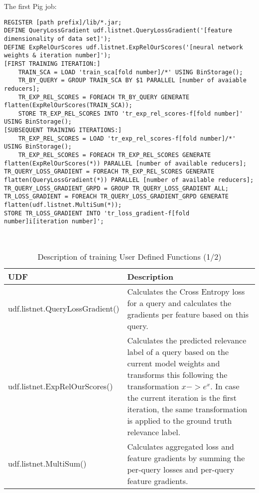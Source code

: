 The first Pig job:\\
\begin{minipage}{\linewidth}
\begin{lstlisting}
REGISTER [path prefix]/lib/*.jar;
DEFINE QueryLossGradient udf.listnet.QueryLossGradient('[feature dimensionality of data set]');
DEFINE ExpRelOurScores udf.listnet.ExpRelOurScores('[neural network weights & iteration number]');
[FIRST TRAINING ITERATION:]
	TRAIN_SCA = LOAD 'train_sca[fold number]/*' USING BinStorage();
	TR_BY_QUERY = GROUP TRAIN_SCA BY $1 PARALLEL [number of avaiable reducers];
	TR_EXP_REL_SCORES = FOREACH TR_BY_QUERY GENERATE flatten(ExpRelOurScores(TRAIN_SCA));
	STORE TR_EXP_REL_SCORES INTO 'tr_exp_rel_scores-f[fold number]' USING BinStorage();
[SUBSEQUENT TRAINING ITERATIONS:]
	TR_EXP_REL_SCORES = LOAD 'tr_exp_rel_scores-f[fold number]/*' USING BinStorage();
	TR_EXP_REL_SCORES = FOREACH TR_EXP_REL_SCORES GENERATE flatten(ExpRelOurScores(*)) PARALLEL [number of available reducers];
TR_QUERY_LOSS_GRADIENT = FOREACH TR_EXP_REL_SCORES GENERATE flatten(QueryLossGradient(*)) PARALLEL [number of available reducers];
TR_QUERY_LOSS_GRADIENT_GRPD = GROUP TR_QUERY_LOSS_GRADIENT ALL;
TR_LOSS_GRADIENT = FOREACH TR_QUERY_LOSS_GRADIENT_GRPD GENERATE flatten(udf.listnet.MultiSum(*));
STORE TR_LOSS_GRADIENT INTO 'tr_loss_gradient-f[fold number]i[iteration number]';
\end{lstlisting}
\end{minipage}\\

\begin{table}
\centering
\begin{tabular}{p{6cm}p{7cm}}\toprule
UDF & Description \\
\midrule
udf.listnet.QueryLossGradient() & Calculates the Cross Entropy loss for a query and calculates the gradients per feature based on this query.\\
udf.listnet.ExpRelOurScores() & Calculates the predicted relevance label of a query based on the current model weights and transforms this following the transformation $x -> e^{x}$. In case the current iteration is the first iteration, the same transformation is applied to the ground truth relevance label.\\
udf.listnet.MultiSum() & Calculates aggregated loss and feature gradients by summing the per-query losses and per-query feature gradients.\\
\bottomrule
\end{tabular}
\caption{Description of training User Defined Functions (1/2)}
\label{tbl:training_udfs_1}
\end{table}

